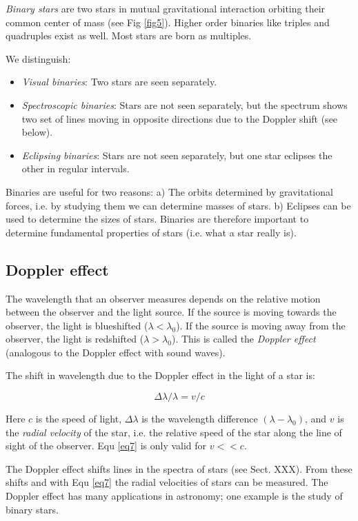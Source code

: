 \textit{Binary stars} are two stars in mutual gravitational interaction orbiting their common center of mass (see Fig \ref{fig5}). Higher order binaries like triples and quadruples exist as well. Most stars are born as multiples.

We distinguish:
\begin{itemize}
\item{\textit{Visual binaries}: Two stars are seen separately.}
\item{\textit{Spectroscopic binaries}: Stars are not seen separately, but the spectrum shows two set of lines moving in opposite directions due to the Doppler shift (see below).}
\item{\textit{Eclipsing binaries}: Stars are not seen separately, but one star eclipses the other in regular intervals.}
\end{itemize}

Binaries are useful for two reasons: a) The orbits determined by gravitational forces, i.e. by studying them we can determine masses of stars. b) Eclipses can be used to determine the sizes of stars. Binaries are therefore important to determine fundamental properties of stars (i.e. what a star really is).

\subsection{Doppler effect}

The wavelength that an observer measures depends on the relative motion between the observer and the light source. If the source is moving towards the observer, the light is blueshifted ($\lambda < \lambda_0$). If the source is moving away from the observer, the light is redshifted ($\lambda >\lambda_0$). This is called the \textit{Doppler effect} (analogous to the Doppler effect with sound waves).

The shift in wavelength due to the Doppler effect in the light of a star is:

\begin{equation}
\Delta\lambda / \lambda = v/c
\label{eq7}
\end{equation}

Here $c$ is the speed of light, $\Delta\lambda$ is the wavelength difference $(\lambda - \lambda_0)$, and $v$ is the \textit{radial velocity} of the star, i.e. the relative speed of the star along the line of sight of the observer. Equ \eqref{eq7} is only valid for $v<<c$.

The Doppler effect shifts lines in the spectra of stars (see Sect. XXX). From these shifts and with Equ \eqref{eq7} the radial velocities of stars can be measured. The Doppler effect has many applications in astronomy; one example is the study of binary stars.

